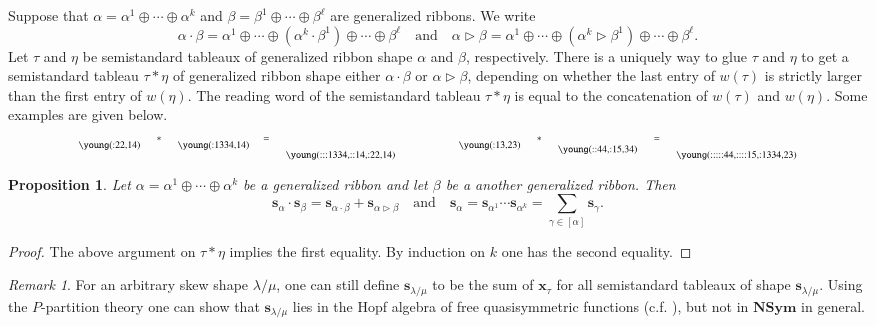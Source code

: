 \documentclass{amsart}
\newtheorem{proposition}[theorem]{Proposition}
\newtheorem*{Young's Rule}{Young's Rule}
\theoremstyle{definition}
\theoremstyle{remark}
\newtheorem{remark}[theorem]{Remark}
\numberwithin{equation}{section}
\begin{document}
Suppose that $\alpha = \alpha^1\oplus\cdots\oplus\alpha^k$ and $\beta = \beta^1\oplus\cdots\oplus\beta^\ell$ are generalized ribbons. We write
\[ \alpha \cdot \beta = \alpha^1\oplus\cdots\oplus(\alpha^k\cdot\beta^1) \oplus\cdots\oplus\beta^\ell
{\quad\text{and}\quad} \alpha \rhd \beta = \alpha^1\oplus\cdots\oplus(\alpha^k\rhd\beta^1) \oplus\cdots\oplus\beta^\ell. \]
Let $\tau$ and $\eta$ be semistandard tableaux of generalized ribbon shape $\alpha$ and $\beta$, respectively. There is a uniquely way to glue $\tau$ and $\eta$ to get a semistandard tableau $\tau*\eta$ of generalized ribbon shape either $\alpha\cdot\beta$ or $\alpha\rhd\beta$, depending on whether the last entry of $w(\tau)$ is strictly larger than the first entry of $w(\eta)$. The reading word of the semistandard tableau $\tau*\eta$ is equal to the concatenation of $w(\tau)$ and $w(\eta)$. Some examples are given below.
\[ \scriptsize
\begin{matrix}
\raisebox{-5pt}{ \young(:22,14) }& * & \raisebox{-5pt}{ \young(:1334,14)} 
& = & \raisebox{-12pt}{ \young(:::1334,::14,:22,14) }
\end{matrix}
\qquad\qquad\qquad
\begin{matrix}
\raisebox{-5pt}{ \young(:13,23) } & * & \raisebox{-8pt}{ \young(::44,:15,34) } 
& = & \raisebox{-12pt}{ \young(:::::44,::::15,:1334,23) }
\end{matrix} \]

\begin{proposition}\label{prop:NSym}
Let $\alpha=\alpha^1\oplus\cdots\oplus\alpha^k$ be a generalized ribbon and let $\beta$ be a another generalized ribbon. Then
\[ {{\mathbf s}}_{\alpha}\cdot{{\mathbf s}}_\beta = {{\mathbf s}}_{\alpha\cdot\beta} + {{\mathbf s}}_{\alpha\rhd\beta} {\quad\text{and}\quad}
{{\mathbf s}}_\alpha = {{\mathbf s}}_{\alpha^1} \cdots {{\mathbf s}}_{\alpha^k} = \sum_{\gamma\in[\alpha]} {{\mathbf s}}_\gamma. \]
\end{proposition}

\begin{proof}
The above argument on $\tau*\eta$ implies the first equality. By induction on $k$ one has the second equality.
\end{proof}

\begin{remark}
For an arbitrary skew shape $\lambda/\mu$, one can still define ${{\mathbf s}}_{\lambda/\mu}$ to be the sum of ${{\mathbf x}}_\tau$ for all semistandard tableaux of shape ${{\mathbf s}}_{\lambda/\mu}$. Using the $P$-partition theory one can show that ${{\mathbf s}}_{\lambda/\mu}$ lies in the Hopf algebra of free quasisymmetric functions (c.f. \cite{NCSF_VI}), but not in ${\mathbf{NSym}}$ in general.
\end{remark}
\end{document}
